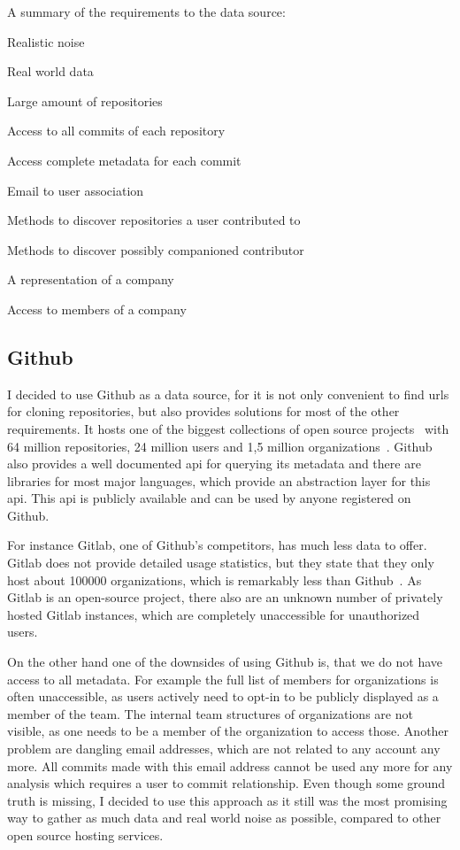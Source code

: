 \begin{itemlist}{A summary of the requirements to the data source:}
    \item Realistic noise
    \item Real world data
    \item Large amount of repositories
    \item Access to all commits of each repository
    \item Access complete metadata for each commit
    \item Email to user association
    \item Methods to discover repositories a user contributed to
    \item Methods to discover possibly companioned contributor
    \item A representation of a company
    \item Access to members of a company
\end{itemlist}


\subsection{Github}\label{github}
I decided to use Github as a data source, for it is not only convenient to find \acp{url} for cloning repositories, but also provides solutions for most of the other requirements.
It hosts one of the biggest collections of open source projects~\cite{techreport:how-github-conquered} with 64 million repositories, 24 million users and 1,5 million organizations~\cite{article:github-statistics}.
Github also provides a well documented \ac{api} for querying its metadata and there are libraries for most major languages, which provide an abstraction layer for this \ac{api}.
This \ac{api} is publicly available and can be used by anyone registered on Github.

For instance Gitlab, one of Github's competitors, has much less data to offer.
Gitlab does not provide detailed usage statistics, but they state that they only host about 100000 organizations, which is remarkably less than Github~\cite{article:gitlab-help}.
As Gitlab is an open-source project, there also are an unknown number of privately hosted Gitlab instances, which are completely unaccessible for unauthorized users.

On the other hand one of the downsides of using Github is, that we do not have access to all metadata.
For example the full list of members for organizations is often unaccessible, as users actively need to opt-in to be publicly displayed as a member of the team.
The internal team structures of organizations are not visible, as one needs to be a member of the organization to access those.
Another problem are dangling email addresses, which are not related to any account any more.
All commits made with this email address cannot be used any more for any analysis which requires a user to commit relationship.
Even though some ground truth is missing, I decided to use this approach as it still was the most promising way to gather as much data and real world noise as possible, compared to other open source hosting services.

